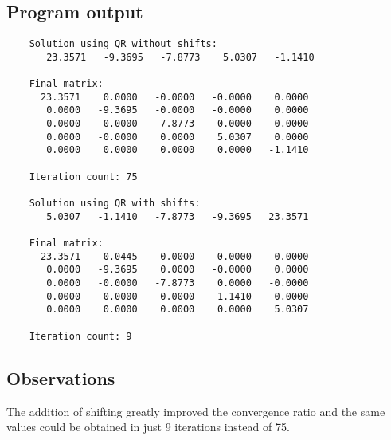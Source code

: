\documentclass{article}
\begin{document}
	\newpage
	\subsection{Program output}
	
	\begin{verbatim}
	Solution using QR without shifts:
	   23.3571   -9.3695   -7.8773    5.0307   -1.1410

	Final matrix:
	  23.3571    0.0000   -0.0000   -0.0000    0.0000
	   0.0000   -9.3695   -0.0000   -0.0000    0.0000
	   0.0000   -0.0000   -7.8773    0.0000   -0.0000
	   0.0000   -0.0000    0.0000    5.0307    0.0000
	   0.0000    0.0000    0.0000    0.0000   -1.1410

	Iteration count: 75
	
	Solution using QR with shifts:
	   5.0307   -1.1410   -7.8773   -9.3695   23.3571

	Final matrix:
	  23.3571   -0.0445    0.0000    0.0000    0.0000
	   0.0000   -9.3695    0.0000   -0.0000    0.0000
	   0.0000   -0.0000   -7.8773    0.0000   -0.0000
	   0.0000   -0.0000    0.0000   -1.1410    0.0000
	   0.0000    0.0000    0.0000    0.0000    5.0307

	Iteration count: 9
	\end{verbatim}
	
	\subsection{Observations}
	
	The addition of shifting greatly improved the convergence ratio and the same
	values could be obtained in just 9 iterations instead of 75.
	
\end{document}
